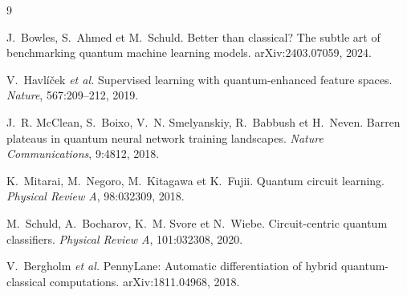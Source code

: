 \documentclass[10pt,a4paper,twocolumn]{article}
\begin{document}
\small
\begin{thebibliography}{9}
\setlength\itemsep{1pt}

J.~Bowles, S.~Ahmed et M.~Schuld.
Better than classical? The subtle art of benchmarking quantum machine learning models.
arXiv:2403.07059, 2024.

V.~Havlíček \emph{et al.}
Supervised learning with quantum-enhanced feature spaces.
\emph{Nature}, 567:209--212, 2019.

J.~R. McClean, S.~Boixo, V.~N. Smelyanskiy, R.~Babbush et H.~Neven.
Barren plateaus in quantum neural network training landscapes.
\emph{Nature Communications}, 9:4812, 2018.

K.~Mitarai, M.~Negoro, M.~Kitagawa et K.~Fujii.
Quantum circuit learning.
\emph{Physical Review A}, 98:032309, 2018.

M.~Schuld, A.~Bocharov, K.~M. Svore et N.~Wiebe.
Circuit-centric quantum classifiers.
\emph{Physical Review A}, 101:032308, 2020.

V.~Bergholm \emph{et al.}
PennyLane: Automatic differentiation of hybrid quantum-classical computations.
arXiv:1811.04968, 2018.

\end{thebibliography}
\end{document}
